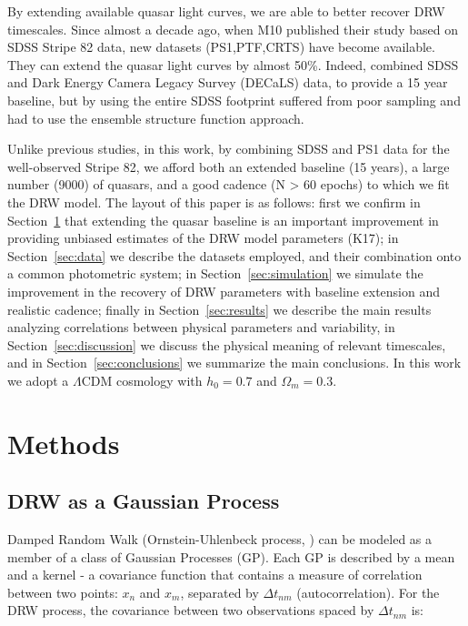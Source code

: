 \documentclass[twocolumn]{aastex62}
\begin{document}
By extending available quasar light curves, we are able to better recover DRW timescales. Since almost a decade ago, when M10 published their study based on SDSS Stripe 82 data, new datasets (PS1,PTF,CRTS) have become available. They can extend the quasar light curves by almost 50\%.  Indeed, \citet{li2018} combined SDSS and Dark Energy Camera Legacy Survey (DECaLS) data, to provide a 15 year baseline, but by using the entire SDSS footprint suffered from poor sampling and had to use the ensemble structure function approach. %


 Unlike previous studies, in this work, by combining SDSS and PS1 data for the well-observed Stripe 82, we afford both an extended baseline (15 years), a large number (9000) of quasars, and  a good cadence (N > 60 epochs) to which we fit the DRW model. The layout of this paper is as follows: first we confirm in Section~\ref{sec:methods} that extending the quasar baseline is an important improvement in providing unbiased estimates of the DRW model parameters (K17);  in Section~\ref{sec:data} we describe the datasets employed, and their combination onto a common photometric system;  in Section~\ref{sec:simulation} we simulate the improvement in the recovery of DRW parameters with baseline extension and realistic cadence; finally in Section~\ref{sec:results} we describe the main results analyzing correlations between physical parameters and variability, in Section~\ref{sec:discussion} we discuss the physical meaning of relevant timescales, and in Section~\ref{sec:conclusions} we summarize the main conclusions. In this work we adopt a $\Lambda $CDM cosmology with $h_{0} = 0.7$ and $\Omega_{m} = 0.3 $. 
%
%
%
%
\section{Methods}
\label{sec:methods}
\subsection{DRW as a Gaussian Process}
Damped Random Walk (Ornstein-Uhlenbeck process, \citealt{rasmussen2006}) can be modeled as a member of a class of Gaussian Processes (GP). Each GP is described by a mean and a kernel - a covariance function that contains a measure of correlation between two points: $x_{n}$ and $x_{m}$, separated by $\Delta t_{nm}$ (autocorrelation). For the  DRW process, the covariance  between two observations spaced by  $\Delta t_{nm}$ is: 
\end{document}
